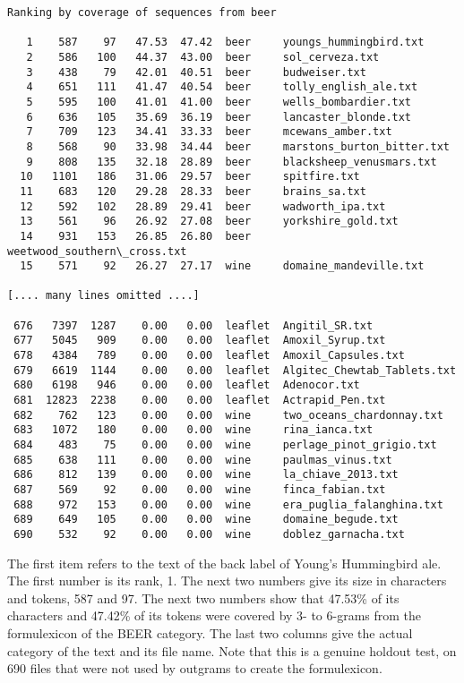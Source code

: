 \documentclass[output=paper]{langscibook}
\begin{document}
\begin{lstlisting}[basicstyle=\small\ttfamily]
Ranking by coverage of sequences from beer

   1    587    97   47.53  47.42  beer     youngs_hummingbird.txt
   2    586   100   44.37  43.00  beer     sol_cerveza.txt
   3    438    79   42.01  40.51  beer     budweiser.txt
   4    651   111   41.47  40.54  beer     tolly_english_ale.txt
   5    595   100   41.01  41.00  beer     wells_bombardier.txt
   6    636   105   35.69  36.19  beer     lancaster_blonde.txt
   7    709   123   34.41  33.33  beer     mcewans_amber.txt
   8    568    90   33.98  34.44  beer     marstons_burton_bitter.txt
   9    808   135   32.18  28.89  beer     blacksheep_venusmars.txt
  10   1101   186   31.06  29.57  beer     spitfire.txt
  11    683   120   29.28  28.33  beer     brains_sa.txt
  12    592   102   28.89  29.41  beer     wadworth_ipa.txt
  13    561    96   26.92  27.08  beer     yorkshire_gold.txt
  14    931   153   26.85  26.80  beer     weetwood_southern\_cross.txt
  15    571    92   26.27  27.17  wine     domaine_mandeville.txt

[.... many lines omitted ....]

 676   7397  1287    0.00   0.00  leaflet  Angitil_SR.txt
 677   5045   909    0.00   0.00  leaflet  Amoxil_Syrup.txt
 678   4384   789    0.00   0.00  leaflet  Amoxil_Capsules.txt
 679   6619  1144    0.00   0.00  leaflet  Algitec_Chewtab_Tablets.txt
 680   6198   946    0.00   0.00  leaflet  Adenocor.txt
 681  12823  2238    0.00   0.00  leaflet  Actrapid_Pen.txt
 682    762   123    0.00   0.00  wine     two_oceans_chardonnay.txt
 683   1072   180    0.00   0.00  wine     rina_ianca.txt
 684    483    75    0.00   0.00  wine     perlage_pinot_grigio.txt
 685    638   111    0.00   0.00  wine     paulmas_vinus.txt
 686    812   139    0.00   0.00  wine     la_chiave_2013.txt
 687    569    92    0.00   0.00  wine     finca_fabian.txt
 688    972   153    0.00   0.00  wine     era_puglia_falanghina.txt
 689    649   105    0.00   0.00  wine     domaine_begude.txt
 690    532    92    0.00   0.00  wine     doblez_garnacha.txt
\end{lstlisting}

The first item refers to the text of the back label of Young's Hummingbird ale. The first number is its rank, 1. The next two numbers give its size in characters and tokens, 587 and 97. The next two numbers show that 47.53\% of its characters and 47.42\% of its tokens were covered by 3- to 6-grams from the formulexicon of the BEER category. The last two columns give the actual category of the text and its file name. Note that this is a genuine holdout test, on 690 files that were not used by outgrams to create the formulexicon.
\end{document}
